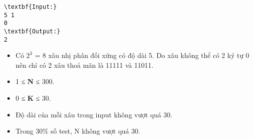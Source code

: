 \begin{verbatim}
\textbf{Input:}
5 1
0
\textbf{Output:}
2\end{verbatim}
\begin{itemize}
	\item Có $2^{3}$ = 8 xâu nhị phân đối xứng có độ dài 5. Do xâu không thể có 2 ký tự 0 nên chỉ có 2 xâu thoả mãn là 11111 và 11011.
\end{itemize}
\begin{itemize}
	\item 1 ≤ \textbf{ N } ≤ 300.
	\item 0 ≤ \textbf{ K } ≤ 30.
	\item Độ dài của mỗi xâu trong input không vượt quá 30.
	\item Trong 30\% số test, N không vượt quá 30.
\end{itemize}